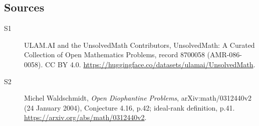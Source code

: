 \documentclass[11pt]{article}
\begin{document}
\subsection{Sources}
\begin{description}
\item[\hypertarget{source:8700058:1}{S1}] ULAM.AI and the UnsolvedMath Contributors, UnsolvedMath: A Curated Collection of Open Mathematics Problems, record 8700058 (AMR-086-0058). CC BY 4.0. \url{https://huggingface.co/datasets/ulamai/UnsolvedMath}.
\item[\hypertarget{source:8700058:2}{S2}] Michel Waldschmidt, \emph{Open Diophantine Problems}, arXiv:math/0312440v2 (24 January 2004), Conjecture 4.16, p.42; ideal-rank definition, p.41. \url{https://arxiv.org/abs/math/0312440v2}.
\end{description}
\label{end:8700058}
\end{document}
